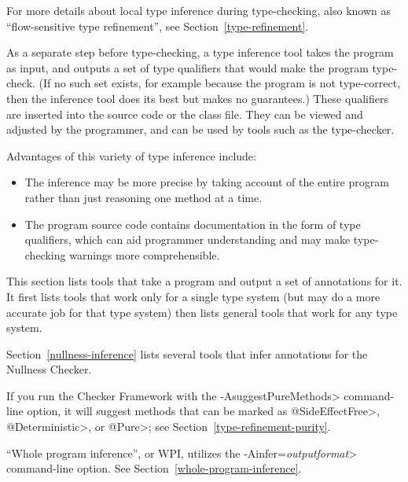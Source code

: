 For more details about local type inference during type-checking, also
known as ``flow-sensitive type refinement'', see
Section~\ref{type-refinement}.



As a separate step before type-checking, a type inference tool takes the
program as input, and outputs a set of type qualifiers that would
make the program type-check.  (If no such set exists, for example because
the program is not type-correct, then the inference tool does its best but
makes no guarantees.)
These qualifiers are inserted into the source code or the
class file.  They can be viewed and adjusted by the programmer, and can
be used by tools such as the type-checker.

Advantages of this variety of type inference include:
\begin{itemize}
\item
  The inference may be more precise by taking account of the entire program
  rather than just reasoning one method at a time.
\item
  The program source code contains documentation in the form of type
  qualifiers, which can aid programmer understanding and may make
  type-checking warnings more comprehensible.
\end{itemize}



This section lists tools that take a program and output a set of
annotations for it.
It first lists tools that work only for a single type system (but may do a
more accurate job for that type system)
then lists general tools that work for any type system.



Section~\ref{nullness-inference} lists several tools that infer
annotations for the Nullness Checker.

If you run the Checker Framework with the \<-AsuggestPureMethods>
command-line option, it will suggest methods that can be marked as
\<@SideEffectFree>, \<@Deterministic>, or \<@Pure>; see
Section~\ref{type-refinement-purity}.



``Whole program inference'', or WPI, utilizes the \<-Ainfer=\emph{outputformat}>
command-line option.  See Section~\ref{whole-program-inference}.


